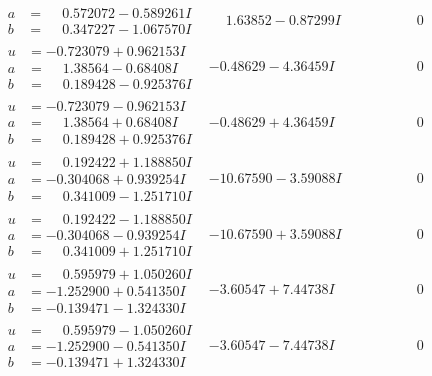 \documentclass[1p]{elsarticle_modified}
\theoremstyle{definition}
\begin{document}
$$\begin{array}{c|c|c}
\begin{aligned}
a &= \phantom{-}0.572072 - 0.589261 I \\
b &= \phantom{-}0.347227 - 1.067570 I\end{aligned}
 & \phantom{-}1.63852 - 0.87299 I & \phantom{-0.000000 } 0 \\ \hline\begin{aligned}
u &= -0.723079 + 0.962153 I \\
a &= \phantom{-}1.38564 - 0.68408 I \\
b &= \phantom{-}0.189428 - 0.925376 I\end{aligned}
 & -0.48629 - 4.36459 I & \phantom{-0.000000 } 0 \\ \hline\begin{aligned}
u &= -0.723079 - 0.962153 I \\
a &= \phantom{-}1.38564 + 0.68408 I \\
b &= \phantom{-}0.189428 + 0.925376 I\end{aligned}
 & -0.48629 + 4.36459 I & \phantom{-0.000000 } 0 \\ \hline\begin{aligned}
u &= \phantom{-}0.192422 + 1.188850 I \\
a &= -0.304068 + 0.939254 I \\
b &= \phantom{-}0.341009 - 1.251710 I\end{aligned}
 & -10.67590 - 3.59088 I & \phantom{-0.000000 } 0 \\ \hline\begin{aligned}
u &= \phantom{-}0.192422 - 1.188850 I \\
a &= -0.304068 - 0.939254 I \\
b &= \phantom{-}0.341009 + 1.251710 I\end{aligned}
 & -10.67590 + 3.59088 I & \phantom{-0.000000 } 0 \\ \hline\begin{aligned}
u &= \phantom{-}0.595979 + 1.050260 I \\
a &= -1.252900 + 0.541350 I \\
b &= -0.139471 - 1.324330 I\end{aligned}
 & -3.60547 + 7.44738 I & \phantom{-0.000000 } 0 \\ \hline\begin{aligned}
u &= \phantom{-}0.595979 - 1.050260 I \\
a &= -1.252900 - 0.541350 I \\
b &= -0.139471 + 1.324330 I\end{aligned}
 & -3.60547 - 7.44738 I & \phantom{-0.000000 } 0 \\ \hline\begin{aligned}

\end{aligned}
\end{array}$$
\end{document}
